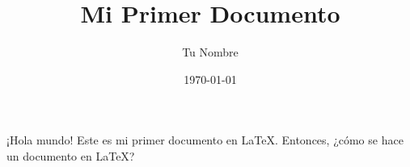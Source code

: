 \documentclass{article}
\title{Mi Primer Documento}
\author{Tu Nombre}
\date{\today}
\begin{document}
\maketitle

¡Hola mundo! Este es mi primer documento en \LaTeX.
Entonces, ¿cómo se hace un documento en \LaTeX?
\end{document}
